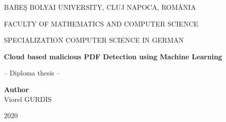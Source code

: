 \documentclass[a4paper,12pt]{report}
\begin{document}
\begin{titlepage}
\sloppy
\begin{center}
BABE\c S BOLYAI UNIVERSITY, CLUJ NAPOCA, ROM\^ ANIA

FACULTY OF MATHEMATICS AND COMPUTER SCIENCE

SPECIALIZATION COMPUTER SCIENCE IN GERMAN

\vspace{6cm}

\Huge \textbf{Cloud based malicious PDF Detection using Machine Learning}

\vspace{1cm}

\normalsize -- Diploma thesis --
\end{center}

\vspace{5cm}

\begin{flushright}
\Large{\textbf{Author}}\\
Viorel GURDIS
\end{flushright}

\vspace{4cm}

\begin{center}
2020
\end{center}

\end{titlepage}


\begin{abstract}
\end{abstract}


\tableofcontents

\newpage

\listoftables
\listoffigures
\listofalgorithms

\newpage


\newpage












\end{document}
